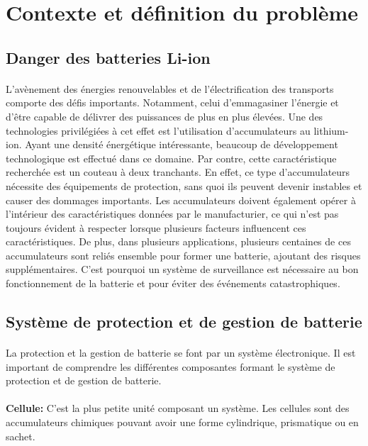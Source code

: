 \section{Contexte et définition du problème}

	\subsection{Danger des batteries Li-ion}
	
		\paragraph{}
		L'avènement des énergies renouvelables et de l'électrification des transports comporte des défis importants. Notamment, celui d'emmagasiner l'énergie et d'être capable de délivrer des puissances de plus en plus élevées. Une des technologies privilégiées à cet effet est l'utilisation d'accumulateurs au lithium-ion. Ayant une densité énergétique intéressante, beaucoup de développement technologique est effectué dans ce domaine. Par contre, cette caractéristique recherchée est un couteau à deux tranchants. En effet, ce type d'accumulateurs nécessite des équipements de protection, sans quoi ils peuvent devenir instables et causer des dommages importants. Les accumulateurs doivent également opérer à l'intérieur des caractéristiques données par le manufacturier, ce qui n'est pas toujours évident à respecter lorsque plusieurs facteurs influencent ces caractéristiques. De plus, dans plusieurs applications, plusieurs centaines de ces accumulateurs sont reliés ensemble pour former une batterie, ajoutant des risques supplémentaires. C'est pourquoi un système de surveillance est nécessaire au bon fonctionnement de la batterie et pour éviter des événements catastrophiques.
	
	\subsection{Système de protection et de gestion de batterie}
	
		\paragraph{}
		La protection et la gestion de batterie se font par un système électronique. Il est important de comprendre les différentes composantes formant le système de protection et de gestion de batterie.
		
		\paragraph{}   \textbf{Cellule:}
		 C'est la plus petite unité composant un système. Les cellules sont des accumulateurs chimiques pouvant avoir une forme cylindrique, prismatique ou en sachet.  
		
